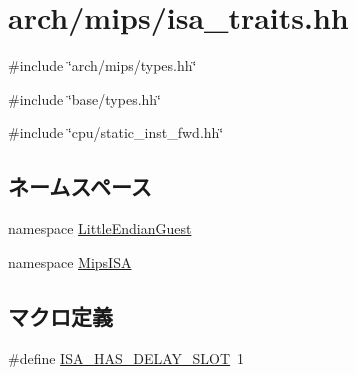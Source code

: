 \hypertarget{mips_2isa__traits_8hh}{
\section{arch/mips/isa\_\-traits.hh}
\label{mips_2isa__traits_8hh}
}
{\ttfamily \#include \char`\"{}arch/mips/types.hh\char`\"{}}\par
{\ttfamily \#include \char`\"{}base/types.hh\char`\"{}}\par
{\ttfamily \#include \char`\"{}cpu/static\_\-inst\_\-fwd.hh\char`\"{}}\par
\subsection*{ネームスペース}
\begin{DoxyCompactItemize}
\item 
namespace \hyperlink{namespaceLittleEndianGuest}{LittleEndianGuest}
\item 
namespace \hyperlink{namespaceMipsISA}{MipsISA}
\end{DoxyCompactItemize}
\subsection*{マクロ定義}
\begin{DoxyCompactItemize}
\item 
\#define \hyperlink{mips_2isa__traits_8hh_aae21ac6833454e7ead9810c372658afc}{ISA\_\-HAS\_\-DELAY\_\-SLOT}~1
\end{DoxyCompactItemize}
